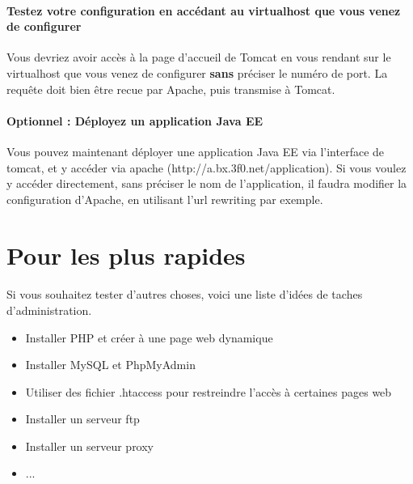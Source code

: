 \documentclass[12pt,a4paper]{article}
\begin{document}

\paragraph{Testez votre configuration en accédant au virtualhost que vous venez de configurer\\}
Vous devriez avoir accès à la page d'accueil de Tomcat en vous rendant sur le virtualhost que vous venez de configurer \textbf{sans} préciser le numéro de port. La requête doit bien être recue par Apache, puis transmise à Tomcat.

\paragraph{Optionnel : Déployez un application Java EE\\}
Vous pouvez maintenant déployer une application Java EE via l'interface de tomcat, et y accéder via apache (http://a.bx.3f0.net/application). Si vous voulez y accéder directement, sans préciser le nom de l'application, il faudra modifier la configuration d'Apache, en utilisant l'url rewriting par exemple.

\section{Pour les plus rapides}

\paragraph{}
Si vous souhaitez tester d'autres choses, voici une liste d'idées de taches d'administration.
\begin{itemize}
\item Installer PHP et créer à une page web dynamique
\item Installer MySQL et PhpMyAdmin
\item Utiliser des fichier .htaccess pour restreindre l'accès à certaines pages web
\item Installer un serveur ftp
\item Installer un serveur proxy
\item ...
\end{itemize}
\end{document}
